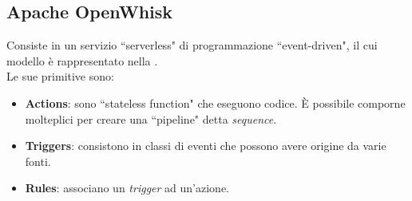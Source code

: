 \documentclass[12pt,a4paper,openany,twoside]{book}
\begin{document}
\subsection{Apache OpenWhisk}

Consiste in un servizio ``serverless" di programmazione ``event-driven", il cui modello è rappresentato nella .
\\
Le sue primitive sono:
\begin{itemize}
    \item \textbf{Actions}: sono ``stateless function" che eseguono codice. È possibile comporne molteplici per creare una ``pipeline" detta \textit{sequence}.
    
    \item \textbf{Triggers}: consistono in classi di eventi che possono avere origine da varie fonti.
    
    \item \textbf{Rules}: associano un \textit{trigger} ad un'azione.
\end{itemize}
\end{document}
